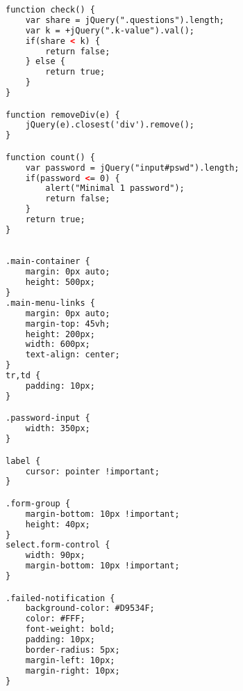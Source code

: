 \begin{lstlisting}[language=html,basicstyle=\tiny,caption=app.js]
function check() {
    var share = jQuery(".questions").length;
    var k = +jQuery(".k-value").val();
    if(share < k) {
        return false;
    } else {
        return true;
    }
}

function removeDiv(e) {
    jQuery(e).closest('div').remove();
}

function count() {
    var password = jQuery("input#pswd").length;
    if(password <= 0) {
        alert("Minimal 1 password");
        return false;
    }
    return true;
}

\end{lstlisting}

\begin{lstlisting}[language=html,basicstyle=\tiny,caption=style.css]

.main-container {
	margin: 0px auto;
	height: 500px;
}
.main-menu-links {
	margin: 0px auto;
	margin-top: 45vh;
	height: 200px;
	width: 600px;
	text-align: center;
}
tr,td {
	padding: 10px;
}

.password-input {
	width: 350px;
}

label {
	cursor: pointer !important;
}

.form-group {
	margin-bottom: 10px !important;
	height: 40px;
}
select.form-control {
	width: 90px;
	margin-bottom: 10px !important;
}

.failed-notification {
    background-color: #D9534F;
    color: #FFF;
    font-weight: bold;
    padding: 10px;
    border-radius: 5px;
    margin-left: 10px;
    margin-right: 10px;
}

\end{lstlisting}